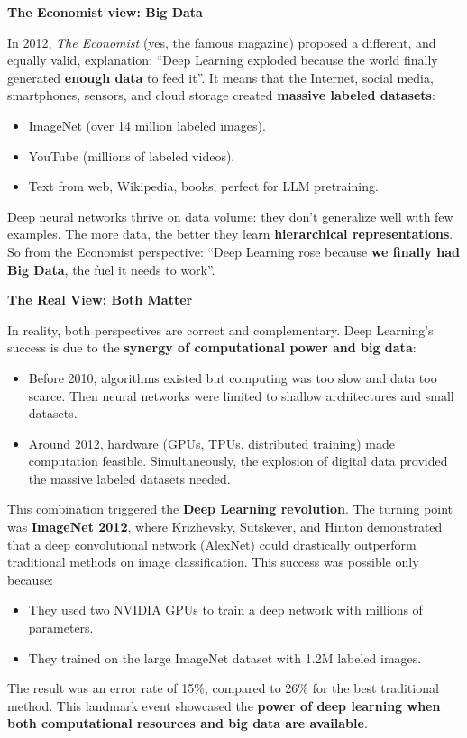 \highspace
\begin{flushleft}
    \textcolor{Green3}{ \textbf{The Economist view: Big Data}}\label{economist-view}
\end{flushleft}
In 2012, \emph{The Economist} (yes, the famous magazine) proposed a different, and equally valid, explanation: ``Deep Learning exploded because the world finally generated \textbf{enough data} to feed it''. It means that the Internet, social media, smartphones, sensors, and cloud storage created \textbf{massive labeled datasets}:
\begin{itemize}
    \item ImageNet (over 14 million labeled images).
    \item YouTube (millions of labeled videos).
    \item Text from web, Wikipedia, books, perfect for LLM pretraining.
\end{itemize}
Deep neural networks thrive on data volume: they don't generalize well with few examples. The more data, the better they learn \textbf{hierarchical representations}. So from the Economist perspective: ``Deep Learning rose because \textbf{we finally had Big Data}, the fuel it needs to work''.

\highspace
\begin{flushleft}
    \textcolor{Green3}{ \textbf{The Real View: Both Matter}}\label{real-view}
\end{flushleft}
In reality, both perspectives are correct and complementary. Deep Learning's success is due to the \textbf{synergy of computational power and big data}:
\begin{itemize}
    \item Before 2010, algorithms existed but computing was too slow and data too scarce. Then neural networks were limited to shallow architectures and small datasets.
    \item Around 2012, hardware (GPUs, TPUs, distributed training) made computation feasible. Simultaneously, the explosion of digital data provided the massive labeled datasets needed.
\end{itemize}
This combination triggered the \textbf{Deep Learning revolution}. The turning point was \textbf{ImageNet 2012}, where Krizhevsky, Sutskever, and Hinton demonstrated that a deep convolutional network (AlexNet) could drastically outperform traditional methods on image classification. This success was possible only because:
\begin{itemize}
    \item They used two NVIDIA GPUs to train a deep network with millions of parameters.
    \item They trained on the large ImageNet dataset with 1.2M labeled images.
\end{itemize}
The result was an error rate of 15\%, compared to 26\% for the best traditional method. This landmark event showcased the \textbf{power of deep learning when both computational resources and big data are available}.